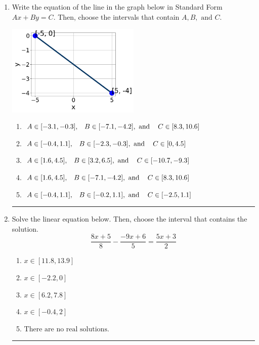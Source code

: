 \documentclass[14pt]{extbook}
\newcommand{\litem}[1]{\item#1\hspace*{-1cm}\rule{\textwidth}{0.4pt}}
\begin{document}
\begin{enumerate}
{\begin{enumerate}[label=\Alph*.]
\end{enumerate} }
\litem{
Write the equation of the line in the graph below in Standard Form $Ax+By=C$. Then, choose the intervals that contain $A, B, \text{ and } C$.
\begin{center}
    \includegraphics[width=0.5\textwidth]{../Figures/linearGraphToStandardCopyA.png}
\end{center}
\begin{enumerate}[label=\Alph*.]
\item \( A \in [-3.1, -0.3], \hspace{3mm} B \in [-7.1, -4.2], \text{ and } \hspace{3mm} C \in [8.3, 10.6] \)
\item \( A \in [-0.4, 1.1], \hspace{3mm} B \in [-2.3, -0.3], \text{ and } \hspace{3mm} C \in [0, 4.5] \)
\item \( A \in [1.6, 4.5], \hspace{3mm} B \in [3.2, 6.5], \text{ and } \hspace{3mm} C \in [-10.7, -9.3] \)
\item \( A \in [1.6, 4.5], \hspace{3mm} B \in [-7.1, -4.2], \text{ and } \hspace{3mm} C \in [8.3, 10.6] \)
\item \( A \in [-0.4, 1.1], \hspace{3mm} B \in [-0.2, 1.1], \text{ and } \hspace{3mm} C \in [-2.5, 1.1] \)

\end{enumerate} }
\litem{
Solve the linear equation below. Then, choose the interval that contains the solution.\[ \frac{8x + 5}{8} - \frac{-9x + 6}{5} = \frac{5x + 3}{2} \]\begin{enumerate}[label=\Alph*.]
\item \( x \in [11.8, 13.9] \)
\item \( x \in [-2.2, 0] \)
\item \( x \in [6.2, 7.8] \)
\item \( x \in [-0.4, 2] \)
\item \( \text{There are no real solutions.} \)


\end{enumerate}}
\end{enumerate}
\end{document}
